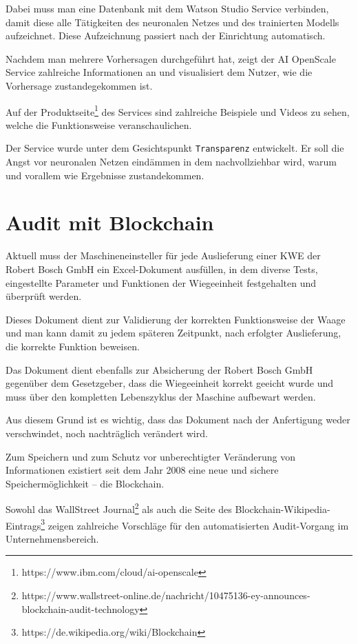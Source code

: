 Dabei muss man eine Datenbank mit dem Watson Studio Service verbinden, damit diese alle Tätigkeiten des neuronalen
Netzes und des trainierten Modells aufzeichnet. Diese Aufzeichnung passiert nach der Einrichtung automatisch.

Nachdem man mehrere Vorhersagen durchgeführt hat, zeigt der AI OpenScale Service zahlreiche Informationen an und
visualisiert dem Nutzer, wie die Vorhersage zustandegekommen ist.

Auf der Produktseite\footnote{https://www.ibm.com/cloud/ai-openscale} des Services sind zahlreiche Beispiele und Videos
zu sehen, welche die Funktionsweise veranschaulichen.

Der Service wurde unter dem Gesichtspunkt \texttt{Transparenz} entwickelt. Er soll die Angst vor neuronalen Netzen
eindämmen in dem nachvollziehbar wird, warum und vorallem wie Ergebnisse zustandekommen.

\section{Audit mit Blockchain}
Aktuell muss der Maschineneinsteller für jede Auslieferung einer KWE der Robert Bosch GmbH ein Excel-Dokument ausfüllen,
in dem diverse Tests, eingestellte Parameter und Funktionen der Wiegeeinheit festgehalten und überprüft werden.

Dieses Dokument dient zur Validierung der korrekten Funktionsweise der Waage und man kann damit zu jedem späteren
Zeitpunkt, nach erfolgter Auslieferung, die korrekte Funktion beweisen.

Das Dokument dient ebenfalls zur Absicherung der Robert Bosch GmbH gegenüber dem Gesetzgeber, dass die Wiegeeinheit
korrekt geeicht wurde und muss über den kompletten Lebenszyklus der Maschine aufbewart werden.

Aus diesem Grund ist es wichtig, dass das Dokument nach der Anfertigung weder verschwindet, noch nachträglich verändert
wird.

Zum Speichern und zum Schutz vor unberechtigter Veränderung von Informationen existiert seit dem Jahr 2008 eine neue
und sichere Speichermöglichkeit -- die Blockchain.

Sowohl das WallStreet
Journal\footnote{https://www.wallstreet-online.de/nachricht/10475136-ey-announces-blockchain-audit-technology} als auch
die Seite des Blockchain-Wikipedia-Eintrags\footnote{https://de.wikipedia.org/wiki/Blockchain} zeigen zahlreiche
Vorschläge für den automatisierten Audit-Vorgang im Unternehmensbereich.

